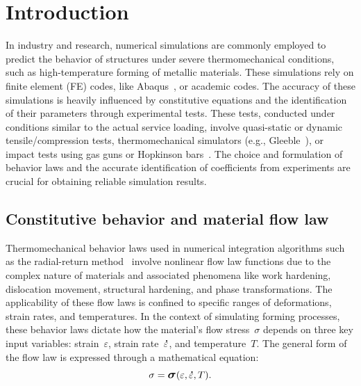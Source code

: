 \documentclass[algorithms,article,submit,pdftex,oneauthors]{Definitions/mdpi}
\DeclareRobustCommand{\mdot}[1]{\accentset{\mbox{\bfseries .}}{#1}}
\DeclareRobustCommand{\Sig}{\mbox{\large\ensuremath{\boldsymbol{\sigma}}}}
\begin{document}
\section{Introduction}\label{sec:Introduction}

In industry and research, numerical simulations are commonly employed to predict the behavior of structures under severe thermomechanical conditions, such as high-temperature forming of metallic materials.
These simulations rely on finite element (FE) codes, like Abaqus~\cite{Abaqus}, or academic codes.
The accuracy of these simulations is heavily influenced by constitutive equations and the identification of their parameters through experimental tests.
These tests, conducted under conditions similar to the actual service loading, involve quasi-static or dynamic tensile/compression tests, thermomechanical simulators (e.g., Gleeble~\cite{Lin-2009-MFS, Bennett-2010-C, Kumar-2016-TMS, Yu-2019-RCR}), or impact tests using gas guns or Hopkinson bars~\cite{Kolsky-1949-IMP}.
The choice and formulation of behavior laws and the accurate identification of coefficients from experiments are crucial for obtaining reliable simulation results.

\subsection{Constitutive behavior and material flow law}\label{subsec:ConstBehavior}

Thermomechanical behavior laws used in numerical integration algorithms such as the radial-return method~\cite{Ponthot-2002-USU} involve nonlinear flow law functions due to the complex nature of materials and associated phenomena like work hardening, dislocation movement, structural hardening, and phase transformations.
The applicability of these flow laws is confined to specific ranges of deformations, strain rates, and temperatures.
In the context of simulating forming processes, these behavior laws dictate how the material's flow stress~$\sigma$ depends on three key input variables: strain~$\varepsilon$, strain rate~$\mdot{\varepsilon}$, and temperature~$T$.
The general form of the flow law is expressed through a mathematical equation:
\begin{equation}
\sigma = \Sig\left(\varepsilon, \mdot{\varepsilon}, T\right).\label{eq:GenFlow}
\end{equation}
\end{document}
